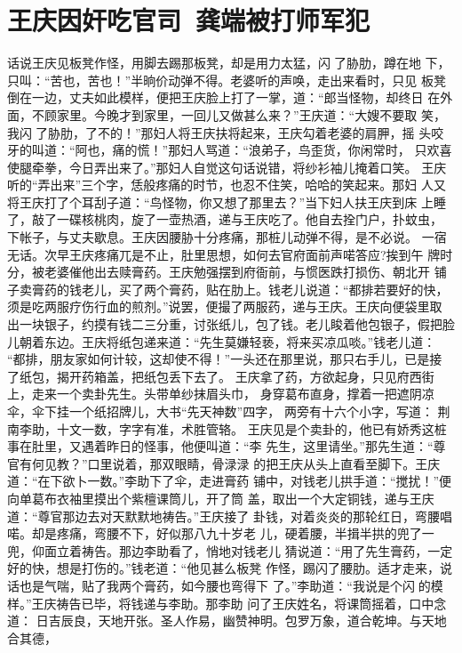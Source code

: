 \chapter{王庆因奸吃官司~龚端被打师军犯}

话说王庆见板凳作怪，用脚去踢那板凳，却是用力太猛，闪了胁肋，蹲在地
下，只叫：“苦也，苦也！”半晌价动弹不得。老婆听的声唤，走出来看时，只见
板凳倒在一边，丈夫如此模样，便把王庆脸上打了一掌，道：“郎当怪物，却终日
在外面，不顾家里。今晚才到家里，一回儿又做甚么来？”王庆道：“大嫂不要取
笑，我闪了胁肋，了不的！”那妇人将王庆扶将起来，王庆勾着老婆的肩胛，摇
头咬牙的叫道：“阿也，痛的慌！”那妇人骂道：“浪弟子，鸟歪货，你闲常时，
只欢喜使腿牵拳，今日弄出来了。”那妇人自觉这句话说错，将纱衫袖儿掩着口笑。
王庆听的“弄出来”三个字，恁般疼痛的时节，也忍不住笑，哈哈的笑起来。那妇
人又将王庆打了个耳刮子道：“鸟怪物，你又想了那里去？”当下妇人扶王庆到床
上睡了，敲了一碟核桃肉，旋了一壶热酒，递与王庆吃了。他自去拴门户，扑蚊虫，
下帐子，与丈夫歇息。王庆因腰胁十分疼痛，那桩儿动弹不得，是不必说。
一宿无话。次早王庆疼痛兀是不止，肚里思想，如何去官府面前声喏答应?挨到午
牌时分，被老婆催他出去赎膏药。王庆勉强摆到府衙前，与惯医跌打损伤、朝北开
铺子卖膏药的钱老儿，买了两个膏药，贴在肋上。钱老儿说道：“都排若要好的快，
须是吃两服疗伤行血的煎剂。”说罢，便撮了两服药，递与王庆。王庆向便袋里取
出一块银子，约摸有钱二三分重，讨张纸儿，包了钱。老儿睃着他包银子，假把脸
儿朝着东边。王庆将纸包递来道：“先生莫嫌轻亵，将来买凉瓜啖。”钱老儿道：
“都排，朋友家如何计较，这却使不得！”一头还在那里说，那只右手儿，已是接
了纸包，揭开药箱盖，把纸包丢下去了。
王庆拿了药，方欲起身，只见府西街上，走来一个卖卦先生。头带单纱抹眉头巾，
身穿葛布直身，撑着一把遮阴凉伞，伞下挂一个纸招牌儿，大书“先天神数”四字，
两旁有十六个小字，写道：
荆南李助，十文一数，字字有准，术胜管辂。
王庆见是个卖卦的，他已有娇秀这桩事在肚里，又遇着昨日的怪事，他便叫道：“李
先生，这里请坐。”那先生道：“尊官有何见教？”口里说着，那双眼睛，骨渌渌
的把王庆从头上直看至脚下。王庆道：“在下欲卜一数。”李助下了伞，走进膏药
铺中，对钱老儿拱手道：“搅扰！”便向单葛布衣袖里摸出个紫檀课筒儿，开了筒
盖，取出一个大定铜钱，递与王庆道：“尊官那边去对天默默地祷告。”王庆接了
卦钱，对着炎炎的那轮红日，弯腰唱喏。却是疼痛，弯腰不下，好似那八九十岁老
儿，硬着腰，半揖半拱的兜了一兜，仰面立着祷告。那边李助看了，悄地对钱老儿
猜说道：“用了先生膏药，一定好的快，想是打伤的。”钱老道：“他见甚么板凳
作怪，踢闪了腰肋。适才走来，说话也是气喘，贴了我两个膏药，如今腰也弯得下
了。”李助道：“我说是个闪的模样。”王庆祷告已毕，将钱递与李助。那李助
问了王庆姓名，将课筒摇着，口中念道：
日吉辰良，天地开张。圣人作易，幽赞神明。包罗万象，道合乾坤。与天地合其德，
